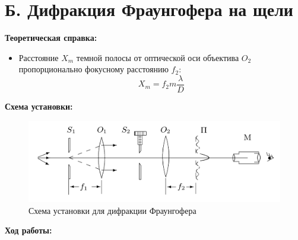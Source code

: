 \documentclass[a4paper, 12pt]{article}
\begin{document}
\section*{Б. Дифракция Фраунгофера на щели}

\textbf{Теоретическая справка:}

\begin{itemize}
    \item Расстояние $X_m$ темной полосы от оптической оси объектива $O_2$ пропорционально фокусному расстоянию $f_2$:
    \begin{equation*}
        X_m = f_2 m \dfrac{\lambda}{D}
    \end{equation*}
\end{itemize}

\newpage

\textbf{Схема установки:}
\begin{figure}[!h]
    \centering
    \includegraphics[scale=0.3]{pic2.png}
    \caption{Схема установки для дифракции Фраунгофера}
    \label{pic2}
\end{figure}

\textbf{Ход работы:}
\end{document}
